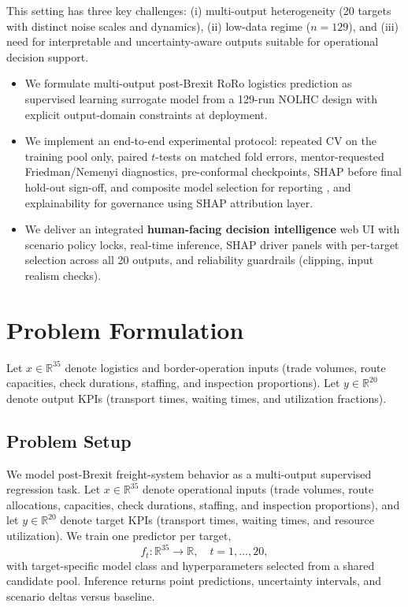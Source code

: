 \documentclass[12pt,twocolumn,a4paper]{article}
\theoremstyle{plain}
\theoremstyle{definition}
\theoremstyle{remark}
\begin{document}
This setting has three key challenges: (i) multi-output heterogeneity (20 targets with distinct noise scales and dynamics), (ii) low-data regime ($n=129$), and (iii) need for interpretable and uncertainty-aware outputs suitable for operational decision support.

\begin{itemize}
 \item We formulate multi-output post-Brexit RoRo logistics prediction as supervised learning surrogate model from a 129-run NOLHC design with explicit output-domain constraints at deployment. 
 \item We implement an end-to-end experimental protocol: repeated CV on the training pool only, paired $t$-tests on matched fold errors, mentor-requested Friedman/Nemenyi diagnostics, pre-conformal checkpoints, SHAP before final hold-out sign-off, and composite model selection for reporting  \cite{vovk2005algorithmic,angelopoulos2021gentle}, and explainability for governance using SHAP attribution layer\cite{lundberg2017shap}.
 \item We deliver an integrated \textbf{human-facing decision intelligence} web UI with scenario policy locks, real-time inference, SHAP driver panels with per-target selection across all 20 outputs, and reliability guardrails (clipping, input realism checks).
\end{itemize}

\section{Problem Formulation}
\label{sec:Problem}
Let $x \in \mathbb{R}^{35}$ denote logistics and border-operation inputs (trade volumes, route capacities, check durations, staffing, and inspection proportions). Let $y \in \mathbb{R}^{20}$ denote output KPIs (transport times, waiting times, and utilization fractions).

\subsection{Problem Setup}
We model post-Brexit freight-system behavior as a multi-output supervised regression task. Let $x \in \mathbb{R}^{35}$ denote operational inputs (trade volumes, route allocations, capacities, check durations, staffing, and inspection proportions), and let $y \in \mathbb{R}^{20}$ denote target KPIs (transport times, waiting times, and resource utilization). We train one predictor per target,
\[
f_t: \mathbb{R}^{35}\rightarrow \mathbb{R},\quad t=1,\dots,20,
\]
with target-specific model class and hyperparameters selected from a shared candidate pool. Inference returns point predictions, uncertainty intervals, and scenario deltas versus baseline.
\end{document}
